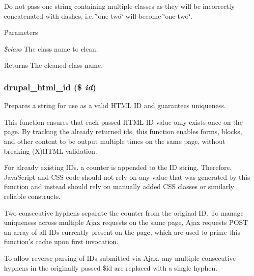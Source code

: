Do not pass one string containing multiple classes as they will be incorrectly concatenated with dashes, i.e. \char`\"{}one two\char`\"{} will become \char`\"{}one-\/two\char`\"{}.


\begin{DoxyParams}{Parameters}
\item[{\em \$class}]The class name to clean.\end{DoxyParams}
\begin{DoxyReturn}{Returns}
The cleaned class name. 
\end{DoxyReturn}
\hypertarget{common_8inc_accaa7f3e2e401747b19be982c9f90323}{
\subsubsection[{drupal\_\-html\_\-id}]{\setlength{\rightskip}{0pt plus 5cm}drupal\_\-html\_\-id (\$ {\em id})}}
\label{common_8inc_accaa7f3e2e401747b19be982c9f90323}
Prepares a string for use as a valid HTML ID and guarantees uniqueness.

This function ensures that each passed HTML ID value only exists once on the page. By tracking the already returned ids, this function enables forms, blocks, and other content to be output multiple times on the same page, without breaking (X)HTML validation.

For already existing IDs, a counter is appended to the ID string. Therefore, JavaScript and CSS code should not rely on any value that was generated by this function and instead should rely on manually added CSS classes or similarly reliable constructs.

Two consecutive hyphens separate the counter from the original ID. To manage uniqueness across multiple Ajax requests on the same page, Ajax requests POST an array of all IDs currently present on the page, which are used to prime this function's cache upon first invocation.

To allow reverse-\/parsing of IDs submitted via Ajax, any multiple consecutive hyphens in the originally passed \$id are replaced with a single hyphen.


